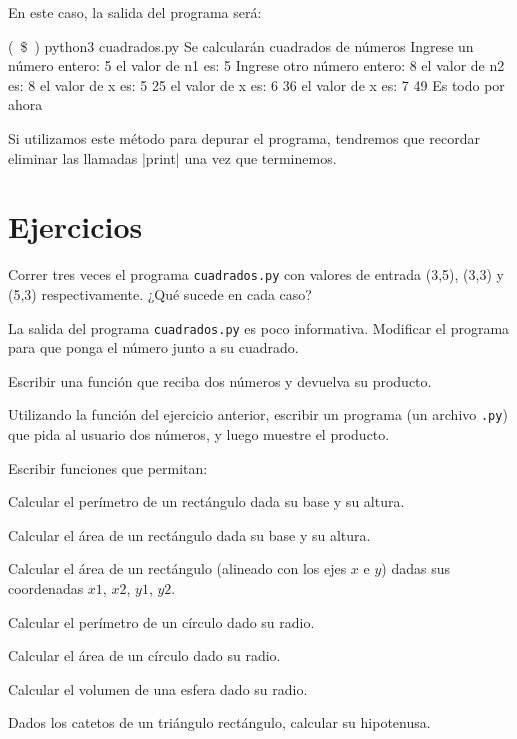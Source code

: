 En este caso, la salida del programa será:

\begin{codigo-nohl-sn}
(~\$~) python3 cuadrados.py
Se calcularán cuadrados de números
Ingrese un número entero: 5
el valor de n1 es: 5
Ingrese otro número entero: 8
el valor de n2 es: 8
el valor de x es: 5
25
el valor de x es: 6
36
el valor de x es: 7
49
Es todo por ahora
\end{codigo-nohl-sn}

Si utilizamos este método para depurar el programa, tendremos que recordar
eliminar las llamadas |print| una vez que terminemos.

\newpage
\section{Ejercicios}

\begin{ejercicio}
Correr tres veces el programa \lstinline!cuadrados.py! con valores
de entrada (3,5), (3,3) y (5,3) respectivamente. ¿Qué sucede en
cada caso?
\end{ejercicio}

\begin{ejercicio}
La salida del programa \lstinline!cuadrados.py! es poco
informativa. Modificar el programa para que ponga el
número junto a su cuadrado.
\end{ejercicio}

\begin{ejercicio}
Escribir una función que reciba dos números y devuelva su producto.
\end{ejercicio}

\begin{ejercicio}
Utilizando la función del ejercicio anterior, escribir un programa (un archivo
\verb|.py|) que pida al usuario dos números, y luego muestre el producto.
\end{ejercicio}

\begin{ejercicio} Escribir funciones que permitan:
\begin{partes}
 \item Calcular el perímetro de un rectángulo dada su base y su altura.
 \item Calcular el área de un rectángulo dada su base y su altura.
 \item Calcular el área de un rectángulo (alineado con los ejes $x$ e $y$)
     dadas sus coordenadas $x1$, $x2$, $y1$, $y2$.
 \item Calcular el perímetro de un círculo dado su radio.
 \item Calcular el área de un círculo dado su radio.
 \item Calcular el volumen de una esfera dado su radio.
 \item Dados los catetos de un triángulo rectángulo, calcular su hipotenusa.
\end{partes}
\end{ejercicio}

